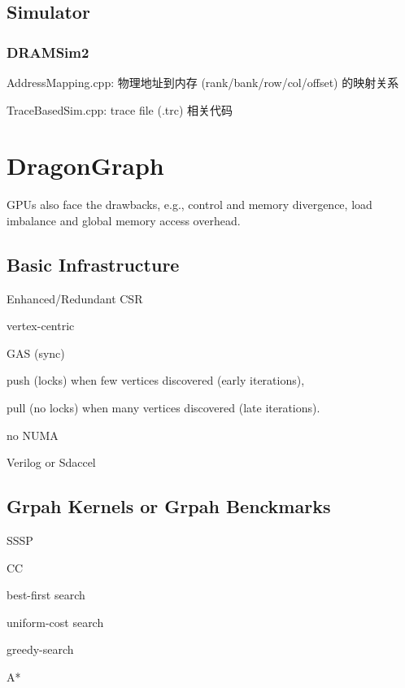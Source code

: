 \documentclass[UTF8,12pt,a4paper]{article}
\begin{document}
\subsection{Simulator}
\subsubsection{DRAMSim2}
\begin{compactitem}
  \item AddressMapping.cpp: 物理地址到内存 (rank/bank/row/col/offset) 的映射关系
  \item TraceBasedSim.cpp: trace file (.trc) 相关代码
\end{compactitem}
\clearpage

\section{DragonGraph}

GPUs also face the drawbacks,
e.g., control and memory divergence,
load imbalance and global memory access overhead.

\subsection{Basic Infrastructure}
\begin{compactitem}
  \item Enhanced/Redundant CSR
  \item vertex-centric
  \item GAS (sync)
  \item push (locks) when few vertices discovered (early iterations),
  \item pull (no locks) when many vertices discovered (late iterations).
  \item no NUMA
  \item Verilog or Sdaccel
\end{compactitem}

\subsection{Grpah Kernels or Grpah Benckmarks}
\begin{compactitem}
  \item SSSP
  \item CC
  \item best-first search
  \item uniform-cost search
  \item greedy-search
  \item A*
\end{compactitem}
\end{document}
